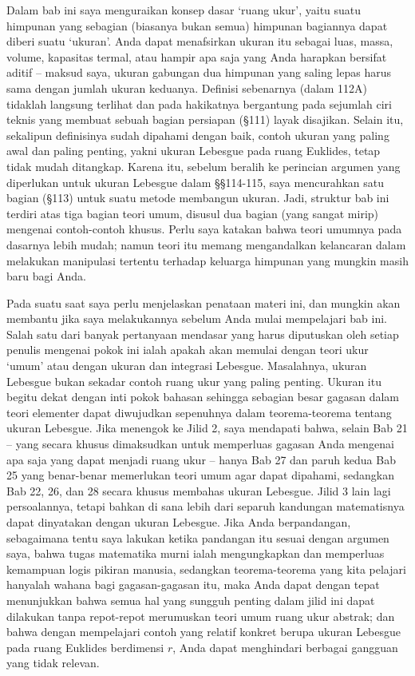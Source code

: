 
\def\chaptername{Ruang ukur}
\def\sectionname{Pendahuluan}


Dalam bab ini saya menguraikan konsep dasar `ruang ukur', yaitu suatu
himpunan yang sebagian (biasanya bukan semua) himpunan bagiannya dapat
diberi suatu `ukuran'. Anda dapat menafsirkan ukuran itu sebagai luas,
massa, volume, kapasitas termal, atau hampir apa saja yang Anda harapkan
bersifat aditif -- maksud saya, ukuran gabungan dua himpunan yang saling
lepas harus sama dengan jumlah ukuran keduanya. Definisi sebenarnya (dalam
112A) tidaklah langsung terlihat dan pada hakikatnya bergantung pada
sejumlah ciri teknis yang membuat sebuah bagian persiapan (\S111) layak
disajikan. Selain itu, sekalipun definisinya sudah dipahami dengan baik,
contoh ukuran yang paling awal dan paling penting, yakni ukuran Lebesgue
pada ruang Euklides, tetap tidak mudah ditangkap. Karena itu, sebelum
beralih ke perincian argumen yang diperlukan untuk ukuran Lebesgue dalam
\S\S114-115, saya mencurahkan satu bagian (\S113) untuk suatu metode
membangun ukuran. Jadi, struktur bab ini terdiri atas tiga bagian teori
umum, disusul dua bagian (yang sangat mirip) mengenai contoh-contoh
khusus. Perlu saya katakan bahwa teori umumnya pada dasarnya lebih mudah;
namun teori itu memang mengandalkan kelancaran dalam melakukan manipulasi
tertentu terhadap keluarga himpunan yang mungkin masih baru bagi Anda.

Pada suatu saat saya perlu menjelaskan penataan materi ini, dan mungkin
akan membantu jika saya melakukannya sebelum Anda mulai mempelajari bab
ini. Salah satu dari banyak pertanyaan mendasar yang harus diputuskan oleh
setiap penulis mengenai pokok ini ialah apakah akan memulai dengan teori
ukur `umum' atau dengan ukuran dan integrasi Lebesgue. Masalahnya, ukuran
Lebesgue bukan sekadar contoh ruang ukur yang paling penting. Ukuran itu
begitu dekat dengan inti pokok bahasan sehingga sebagian besar gagasan
dalam teori elementer dapat diwujudkan sepenuhnya dalam teorema-teorema
tentang ukuran Lebesgue. Jika menengok ke Jilid 2, saya mendapati bahwa,
selain Bab 21 -- yang secara khusus dimaksudkan untuk memperluas gagasan
Anda mengenai apa saja yang dapat menjadi ruang ukur -- hanya Bab 27 dan
paruh kedua Bab 25 yang benar-benar memerlukan teori umum agar dapat
dipahami, sedangkan Bab 22, 26, dan 28 secara khusus membahas ukuran
Lebesgue. Jilid 3 lain lagi persoalannya, tetapi bahkan di sana lebih dari
separuh kandungan matematisnya dapat dinyatakan dengan ukuran Lebesgue.
Jika Anda berpandangan, sebagaimana tentu saya lakukan ketika pandangan
itu sesuai dengan argumen saya, bahwa tugas matematika murni ialah
mengungkapkan dan memperluas kemampuan logis pikiran manusia, sedangkan
teorema-teorema yang kita pelajari hanyalah wahana bagi gagasan-gagasan itu, maka
Anda dapat dengan tepat menunjukkan bahwa semua hal yang sungguh penting
dalam jilid ini dapat dilakukan tanpa repot-repot merumuskan teori umum
ruang ukur abstrak; dan bahwa dengan mempelajari contoh yang relatif
konkret berupa ukuran Lebesgue pada ruang Euklides berdimensi $r$, Anda
dapat menghindari berbagai gangguan yang tidak relevan.

